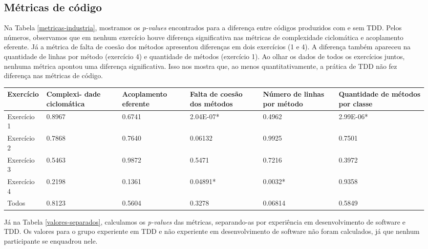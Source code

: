\documentclass[conference]{IEEEtran}
\begin{document}
\subsection{Métricas de código}

Na Tabela \ref{metricas-industria}, mostramos os \textit{p-values} encontrados para
a diferença entre códigos produzidos com e sem TDD. 
Pelos números, 
observamos que em nenhum exercício houve diferença significativa nas métricas
de complexidade ciclomática e acoplamento eferente. Já a métrica de falta
de coesão dos métodos apresentou diferenças em dois exercícios (1 e 4). 
A diferença também apareceu na quantidade de linhas por método (exercício 4)
e quantidade de métodos (exercício 1). Ao olhar os dados de todos os exercícios
juntos, nenhuma métrica apontou uma diferença significativa.
Isso nos mostra que, ao menos quantitativamente, a prática de TDD não fez
diferença nas métricas de código.

\begin{table*}
	\centering
	\begin{tabular}{ | p{3cm} | p{2cm} | p{2cm} | p{2cm} | p{2cm} | p{2cm} |}
		\hline
		Exercício & Complexi- dade ciclomática & Acoplamento eferente & Falta de coesão dos métodos & Número de linhas por método 
		& Quantidade de métodos por classe \\
		\hline
		Exercício 1 &	0.8967	&	0.6741 &	\cellcolor[gray]{0.8}2.04E-07* &	0.4962 &	\cellcolor[gray]{0.8}2.99E-06* \\
		Exercício 2	& 0.7868	&	0.7640 &	0.06132 &	0.9925 &	0.7501 \\
		Exercício 3	& 0.5463	&	0.9872 &	0.5471 &	0.7216 &	0.3972\\
		Exercício 4	& 0.2198	&	0.1361 &	\cellcolor[gray]{0.8}0.04891* &	\cellcolor[gray]{0.8}0.0032* &	0.9358\\
		\hline
		Todos &	0.8123	&	0.5604 &	0.3278 &	0.06814 &	0.5849\\
		\hline
	\end{tabular}
	\caption{\textit{P-values} encontrados para a diferença entre códigos com e sem TDD na indústria}
	\label{metricas-industria}
\end{table*}

Já na Tabela \ref{valores-separados},
calculamos os \textit{p-values} das métricas, separando-as 
por experiência em desenvolvimento de software e TDD. Os valores para o grupo
experiente em TDD e não experiente em desenvolvimento de software não foram calculados, já que nenhum
participante se enquadrou nele.
\end{document}
